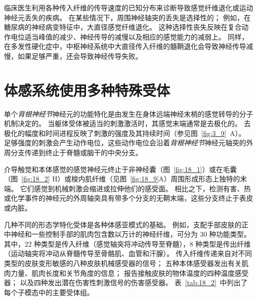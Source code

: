 临床医生利用各种传入纤维的传导速度的已知分布来诊断导致感觉纤维退化或运动神经元丢失的疾病。
在某些情况下，周围神经轴突的丢失是选择性的；
例如，在糖尿病的神经病变特征中，大直径感觉纤维退化。
这种选择性丧失反映在复合动作电位适当峰值的减少、神经传导的减慢以及相应的感觉能力的减弱上。
同样，在多发性硬化症中，中枢神经系统中大直径传入纤维的髓鞘退化会导致神经传导减慢，如果足够严重，还会导致神经传导失败。


\section{体感系统使用多种特殊受体}

单个\textit{背根神经节}神经元的功能特化是由发生在身体远端神经末梢的感觉转导的分子机制决定的。
当躯体受体被适当的刺激激活时，其感觉末端通常是去极化的。
去极化的幅度和时间进程反映了刺激的强度及其持续时间（参见图~\ref{fig:3_9}~A）。 
足够强度的刺激会产生动作电位，这些动作电位会沿着\textit{背根神经节}神经元轴突的外周分支传递到终止于脊髓或脑干的中央分支。


介导触觉和本体感觉的感觉神经元终止于非神经囊（图~\ref{fig:18_1}）或在毛囊（图~\ref{fig:18_2} H）或梭内肌纤维（见图~\ref{fig:18_9}A）周围形成形态上独特的末端。
它们感觉到机械刺激会缩进或拉伸他们的感受面。
相比之下，检测有害、热或化学事件的神经元的外周轴突具有带多个分支的无鞘末端，这些分支终止于表皮或内脏。


几种不同的形态学特化受体是各种体感亚模式的基础。
例如，支配手部皮肤的正中神经和一些控制手部的肌肉包含数以万计的神经纤维，可分为 30 种功能类型。
其中，22 种类型是传入纤维（感觉轴突将冲动传导至脊髓），8 种类型是传出纤维（运动轴突将冲动从脊髓传导至骨骼肌、血管和汗腺）。
传入纤维传递来自对不同类型的皮肤变形敏感的八种皮肤机械感受器的信号；
五种本体感受器发出有关肌肉力量、肌肉长度和关节角度的信息；
报告接触皮肤的物体温度的四种温度感受器；
以及四种发出潜在伤害性刺激信号的伤害感受器。
表~\ref{tab:18_2}~中列出了每个子模态中的主要受体组。


